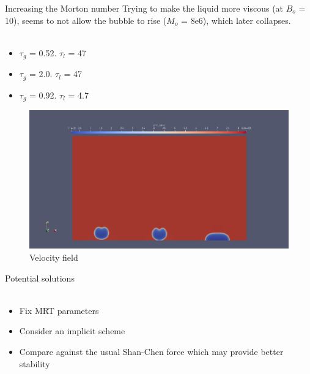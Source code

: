\documentclass[8pt]{beamer}
\begin{document}
	
	\begin{frame}{Increasing the Morton number}
		Trying to make the liquid more viscous (at $B_o$ = 10), seems to not allow the bubble to rise ($M_o$ = 8e6), which later collapses.\\~\\
		\begin{itemize}
			\item $\tau_g$ = 0.52. $\tau_l$ = 47
			\item $\tau_g$ = 2.0. $\tau_l$ = 47 
			\item $\tau_g$ = 0.92. $\tau_l$ = 4.7 
		\end{itemize}
		\begin{figure}
			\centering
			\includegraphics[scale=0.15]{pics/risingCompDen456.png}
			\\{\tiny \justifying Velocity field}
		\end{figure}
	\end{frame}
	
	\begin{frame}{Potential solutions}
		\textbf{}\\~\\
		\begin{itemize}
			\item Fix MRT parameters
			\item Consider an implicit scheme
			\item Compare against the usual Shan-Chen force which may provide better stability 
		\end{itemize}
	\end{frame}
	
\end{document}
